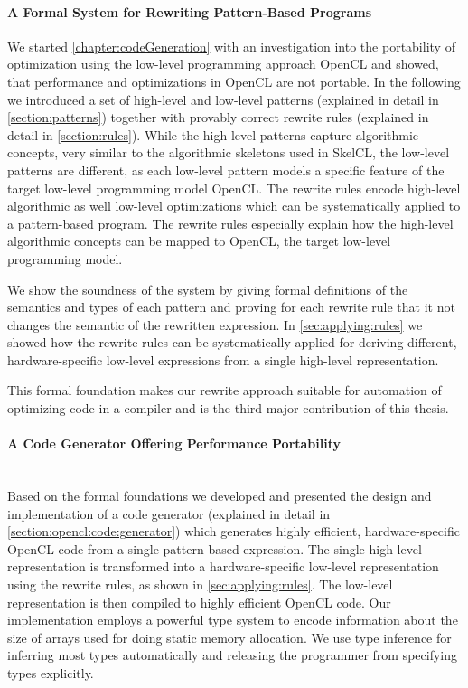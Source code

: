 \paragraph{A Formal System for Rewriting Pattern-Based Programs}
We started \autoref{chapter:codeGeneration} with an investigation into the portability of optimization using the low-level programming approach OpenCL and showed, that performance and optimizations in OpenCL are not portable.
In the following we introduced a set of high-level and low-level patterns (explained in detail in \autoref{section:patterns}) together with provably correct rewrite rules (explained in detail in \autoref{section:rules}).
While the high-level patterns capture algorithmic concepts, very similar to the algorithmic skeletons used in SkelCL, the low-level patterns are different, as each low-level pattern models a specific feature of the target low-level programming model OpenCL.
The rewrite rules encode high-level algorithmic as well low-level optimizations which can be systematically applied to a pattern-based program.
The rewrite rules especially explain how the high-level algorithmic concepts can be mapped to OpenCL, the target low-level programming model.

We show the soundness of the system by giving formal definitions of the semantics and types of each pattern and proving for each rewrite rule that it not changes the semantic of the rewritten expression.
In \autoref{sec:applying:rules} we showed how the rewrite rules can be systematically applied for deriving different, hardware-specific low-level expressions from a single high-level representation.

\bigskip
This formal foundation makes our rewrite approach suitable for automation of optimizing code in a compiler and is the third major contribution of this thesis.

\paragraph{A Code Generator Offering Performance Portability}\hfill\\
Based on the formal foundations we developed and presented the design and implementation of a code generator (explained in detail in \autoref{section:opencl:code:generator}) which generates highly efficient, hardware-specific OpenCL code from a single pattern-based expression.
The single high-level representation is transformed into a hardware-specific low-level representation using the rewrite rules, as shown in \autoref{sec:applying:rules}.
The low-level representation is then compiled to highly efficient OpenCL code.
Our implementation employs a powerful type system to encode information about the size of arrays used for doing static memory allocation.
We use type inference for inferring most types automatically and releasing the programmer from specifying types explicitly.

